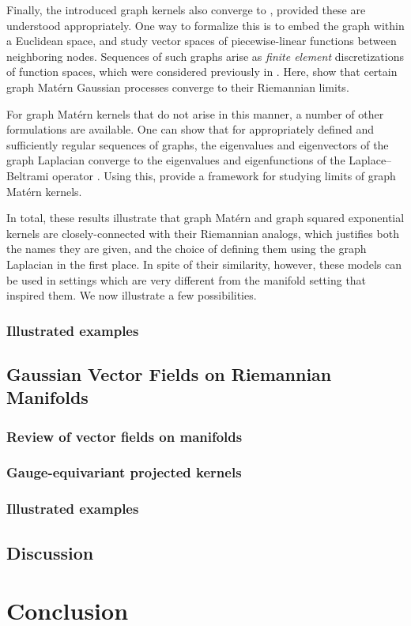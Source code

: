 \documentclass[11pt]{book}
\begin{document}
Finally, the introduced graph kernels also converge to , provided these are understood appropriately.
One way to formalize this is to embed the graph within a Euclidean space, and study vector spaces of piecewise-linear functions between neighboring nodes.
Sequences of such graphs arise as \emph{finite element} discretizations of function spaces, which were considered previously in .
Here, \textcite{lindgren11} show that certain graph Matérn Gaussian processes converge to their Riemannian limits.

For graph Matérn kernels that do not arise in this manner, a number of other formulations are available.
One can show that for appropriately defined and sufficiently regular sequences of graphs, the eigenvalues and eigenvectors of the graph Laplacian converge to the eigenvalues and eigenfunctions of the Laplace--Beltrami operator \cite{belkin07,burago14}.
Using this, \textcite{sanzalonso20} provide a framework for studying limits of graph Matérn kernels.

In total, these results illustrate that graph Matérn and graph squared exponential kernels are closely-connected with their Riemannian analogs, which justifies both the names they are given, and the choice of defining them using the graph Laplacian in the first place.
In spite of their similarity, however, these models can be used in settings which are very different from the manifold setting that inspired them.
We now illustrate a few possibilities.

\subsection{Illustrated examples}
\section{Gaussian Vector Fields on Riemannian Manifolds}

\subsection{Review of vector fields on manifolds}
\subsection{Gauge-equivariant projected kernels}
\subsection{Illustrated examples}

\section{Discussion}
\label{sec:noneuclidean-discussion}





\chapter{Conclusion}
\label{ch:conclusion}

\printbibliography
\end{document}
